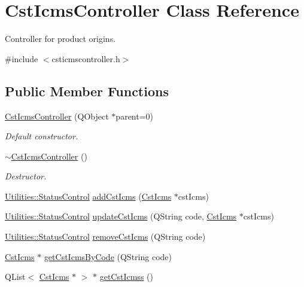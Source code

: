\hypertarget{class_cst_icms_controller}{\section{\-Cst\-Icms\-Controller \-Class \-Reference}
\label{class_cst_icms_controller}
}


\-Controller for product origins.  




{\ttfamily \#include $<$csticmscontroller.\-h$>$}

\subsection*{\-Public \-Member \-Functions}
\begin{DoxyCompactItemize}
\item 
\hyperlink{class_cst_icms_controller_a7034aba6bbb7e0b35f4fa164d3d184ff}{\-Cst\-Icms\-Controller} (\-Q\-Object $\ast$parent=0)
\begin{DoxyCompactList}\small\item\em \-Default constructor. \end{DoxyCompactList}\item 
\hyperlink{class_cst_icms_controller_a3d9d750b7c212ecede097c8a5570cea8}{$\sim$\-Cst\-Icms\-Controller} ()
\begin{DoxyCompactList}\small\item\em \-Destructor. \end{DoxyCompactList}\item 
\hyperlink{class_utilities_a2974f062d85bdb0c444a1cbe554bf228}{\-Utilities\-::\-Status\-Control} \hyperlink{class_cst_icms_controller_acadcfbfb960bb5fb9798e5bf78403bdc}{add\-Cst\-Icms} (\hyperlink{class_cst_icms}{\-Cst\-Icms} $\ast$cst\-Icms)
\item 
\hyperlink{class_utilities_a2974f062d85bdb0c444a1cbe554bf228}{\-Utilities\-::\-Status\-Control} \hyperlink{class_cst_icms_controller_a3e0a72388aac8ffa73ed8d36ab96ef15}{update\-Cst\-Icms} (\-Q\-String code, \hyperlink{class_cst_icms}{\-Cst\-Icms} $\ast$cst\-Icms)
\item 
\hyperlink{class_utilities_a2974f062d85bdb0c444a1cbe554bf228}{\-Utilities\-::\-Status\-Control} \hyperlink{class_cst_icms_controller_a52297e61ec12e15be9b0e0a2d93a23fb}{remove\-Cst\-Icms} (\-Q\-String code)
\item 
\hyperlink{class_cst_icms}{\-Cst\-Icms} $\ast$ \hyperlink{class_cst_icms_controller_a8f8804f4e1941b8cd3ef29bcd7813fc1}{get\-Cst\-Icms\-By\-Code} (\-Q\-String code)
\item 
\-Q\-List$<$ \hyperlink{class_cst_icms}{\-Cst\-Icms} $\ast$ $>$ $\ast$ \hyperlink{class_cst_icms_controller_a8b064e526706df05297d05e625656072}{get\-Cst\-Icmss} ()
\end{DoxyCompactItemize}


